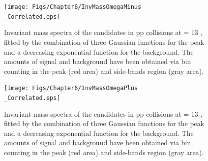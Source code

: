 \begin{figure}[!p]
	\hspace*{-1.5cm}
	\texttt{[image: Figs/Chapter6/InvMassOmegaMinus\\\_Correlated.eps]}
\caption{Invariant mass spectra of the \rmOmegaM candidates in pp collisions at \sqrtS = 13 \tev, fitted by the combination of three Gaussian functions for the peak and a decreasing exponential function for the background. The amounts of signal and background have been obtained via bin counting in the peak (red area) and side-bands region (gray area).}
	\label{fig:InvMassOmegaMinusVsPt}
\end{figure}

\begin{figure}[!p]
	\hspace*{-1.5cm}
	\texttt{[image: Figs/Chapter6/InvMassOmegaPlus\\\_Correlated.eps]}
\caption{Invariant mass spectra of the \rmAomegaP candidates in pp collisions at \sqrtS = 13 \tev, fitted by the combination of three Gaussian functions for the peak and a decreasing exponential function for the background. The amounts of signal and background have been obtained via bin counting in the peak (red area) and side-bands region (gray area).}
	\label{fig:InvMassOmegaPlusVsPt}
\end{figure}

